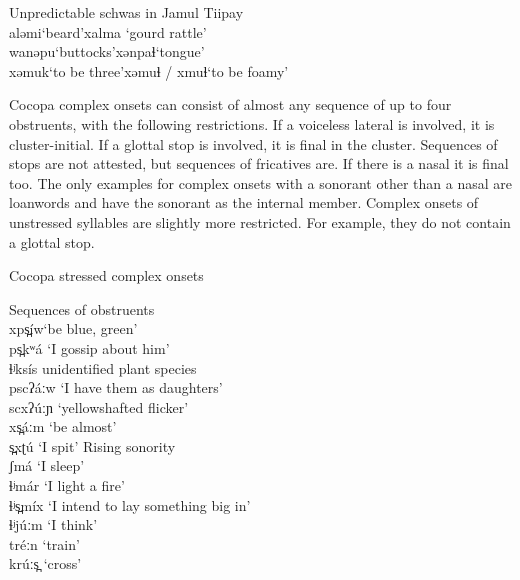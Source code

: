 \documentclass[output=paper,colorlinks,citecolor=brown]{langscibook}
\begin{document}
\begin{exe}
    \ex \label{ex:Kramer:6}Unpredictable schwas in Jamul Tiipay \citep[21]{Miller2001}\\
    aləmi\tab    ‘beard’\tab       xalma \tab        ‘gourd rattle’\\
    wanəpu\tab   ‘buttocks’\tab     xənpaɬ\tab         ‘tongue’\\
    xəmuk\tab  ‘to be three’\tab  xəmuɬ / xmuɬ\tab    ‘to be foamy’
\end{exe}


Cocopa complex onsets can consist of almost any sequence of up to four obstruents, with the following restrictions. If a voiceless lateral is involved, it is cluster-initial. If a glottal stop is involved, it is final in the cluster. Sequences of stops are not attested, but sequences of fricatives are. If there is a nasal it is final too. The only examples for complex onsets with a sonorant other than a nasal are loanwords and have the sonorant as the internal member. Complex onsets of unstressed syllables are slightly more restricted. For example, they do not contain a glottal stop.

\begin{exe}
    \ex \label{ex7}Cocopa stressed complex onsets
    \begin{xlist}
        \ex Sequences of obstruents\\
        xps̪íw\tab     ‘be blue, green’\\
        ps̪kʷá \tab  ‘I gossip about him’\\
        ɬʲksís  \tab   unidentified plant species \\
        pscʔáːw  \tab ‘I have them as daughters’ \\
        scxʔúːɲ  \tab  ‘yellowshafted flicker’\\
        xs̪áːm \tab    ‘be almost’\\
        s̪xʈú  \tab   ‘I spit’        
        \ex Rising sonority \\
         ʃmá \tab    ‘I sleep’\\
         ɬʲmár  \tab   ‘I light a fire’ \\ ɬʲs̪míx \tab ‘I intend to lay something big in’\\
         ɬʲjúːm  \tab ‘I think’\\
         tréːn  \tab   ‘train’\\
         krúːs̪   \tab  ‘cross’
    \end{xlist}
\end{exe}
\end{document}
